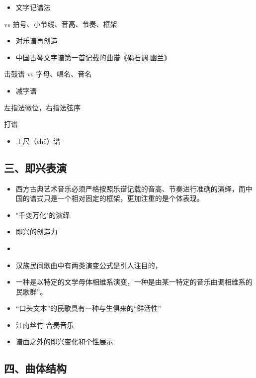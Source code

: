 \documentclass[
]{article}
\providecommand{\tightlist}{%
  \setlength{\itemsep}{0pt}\setlength{\parskip}{0pt}}
\begin{document}
\begin{itemize}
\tightlist
\item
  文字记谱法
\end{itemize}

vs 拍号、小节线、音高、节奏、框架

\begin{itemize}
\tightlist
\item
  对乐谱再创造
\item
  中国古琴文字谱第一首记载的曲谱《碣石调.幽兰》
\end{itemize}

击鼓谱 vs 字母、唱名、音名

\begin{itemize}
\tightlist
\item
  减字谱
\end{itemize}

左指法徽位，右指法弦序

打谱

\begin{itemize}
\tightlist
\item
  工尺（chě）谱
\end{itemize}

\subsection{三、即兴表演}\label{ux4e09ux5373ux5174ux8868ux6f14}

\begin{itemize}
\tightlist
\item
  西方古典艺术音乐必须严格按照乐谱记载的音高、节奏进行准确的演绎，而中国的谱式只是一个相对固定的框架，更加注重的是个体表现。
\item
  "千变万化"的演绎
\item
  即兴的创造力
\item
\item
  汉族民间歌曲中有两类演变公式是引人注目的，
\item
  一种是以特定的文学母体相维系演变，一种是由某一特定的音乐曲调相维系的民歌群''。
\item
  ``口头文本''的民歌具有一种与生俱来的``鲜活性''
\item
  江南丝竹 合奏音乐
\item
  谱面之外的即兴变化和个性展示
\end{itemize}

\subsection{四、曲体结构}\label{ux56dbux66f2ux4f53ux7ed3ux6784}
\end{document}
